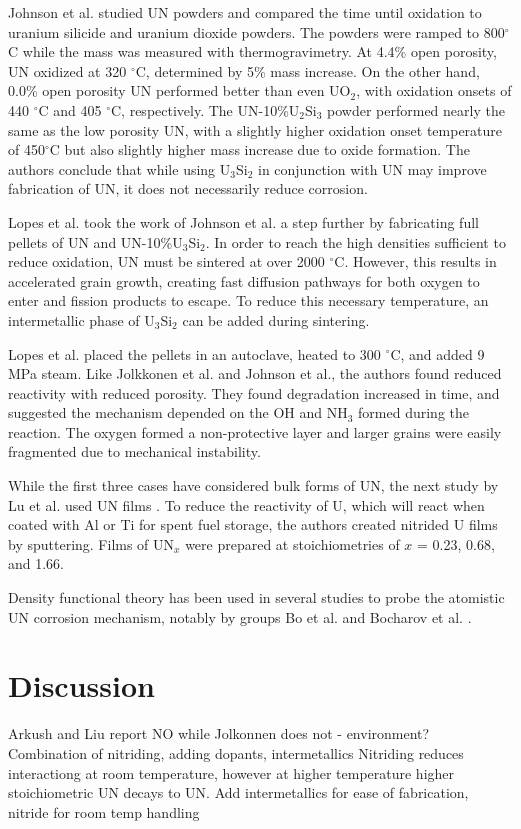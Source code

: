 \documentclass[3p,review,11pt]{elsarticle}
\begin{document}
Johnson et al. \cite{Johnson2016} studied UN powders and compared the time until oxidation to uranium silicide and uranium dioxide powders. The powders were ramped to 800$^{\circ}$C while the mass was measured with thermogravimetry. At 4.4\% open porosity, UN oxidized at 320 $^{\circ}$C, determined by 5\% mass increase. On the other hand, 0.0\% open porosity UN performed better than even UO$_{2}$, with oxidation onsets of 440 $^{\circ}$C and 405 $^{\circ}$C, respectively. The UN-10\%U$_{2}$Si$_{3}$ powder performed nearly the same as the low porosity UN, with a slightly higher oxidation onset temperature of 450$^{\circ}$C but also slightly higher mass increase due to oxide formation. The authors conclude that while using U$_{3}$Si$_{2}$ in conjunction with UN may improve fabrication of UN, it does not necessarily reduce corrosion.
\par 
Lopes et al. \cite{Lopes2017} took the work of Johnson et al. a step further by fabricating full pellets of UN and UN-10\%U$_{3}$Si$_{2}$. In order to reach the high densities sufficient to reduce oxidation, UN must be sintered at over 2000 $^{\circ}$C. However, this results in accelerated grain growth, creating fast diffusion pathways for both oxygen to enter and fission products to escape. To reduce this necessary temperature, an intermetallic phase of U$_{3}$Si$_{2}$ can be added during sintering.
\par 
Lopes et al. placed the pellets in an autoclave, heated to 300 $^{\circ}$C, and added 9 MPa steam. Like Jolkkonen et al. and Johnson et al., the authors found reduced reactivity with reduced porosity. They found degradation increased in time, and suggested the mechanism depended on the OH and NH$_{3}$ formed during the reaction. The oxygen formed a non-protective layer and larger grains were easily fragmented due to mechanical instability.

While the first three cases have considered bulk forms of UN, the next study by Lu et al. used UN films \cite{Lu2016}. To reduce the reactivity of U, which will react when coated with Al or Ti for spent fuel storage, the authors created nitrided U films by sputtering. Films of UN$_{x}$ were prepared at stoichiometries of $x$ = 0.23, 0.68, and 1.66.
\par 
Density functional theory has been used in several studies to probe the atomistic UN corrosion mechanism, notably by groups Bo et al. \cite{Bo2016} and Bocharov et al. \cite{Bocharov2013}.



\section{Discussion}
Arkush and Liu report NO while Jolkonnen does not - environment?
Combination of nitriding, adding dopants, intermetallics
Nitriding reduces interactiong at room temperature, however at higher temperature higher stoichiometric UN decays to UN.
Add intermetallics for ease of fabrication, nitride for room temp handling
\par 
\end{document}
